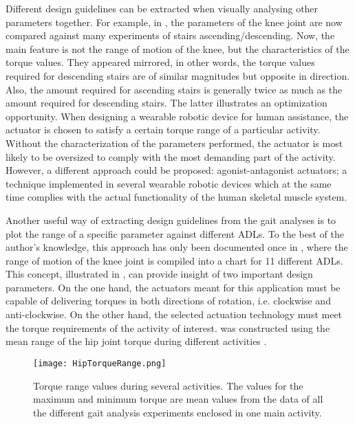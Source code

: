 Different design guidelines can be extracted when visually analysing other parameters together. For example, in  , the parameters of the knee joint are now compared against many experiments of stairs ascending/descending. Now, the main feature is not the range of motion of the knee, but the characteristics of the torque values. They appeared mirrored, in other words, the torque values required for descending stairs are of similar magnitudes but opposite in direction. Also, the amount required for ascending stairs is generally twice as much as the amount required for descending stairs. The latter illustrates an optimization opportunity. When designing a wearable robotic device for human assistance, the actuator is chosen to satisfy a certain torque range of a particular activity. Without the characterization of the parameters performed, the actuator is most likely to be oversized to comply with the most demanding part of the activity. However, a different approach could be proposed: agonist-antagonist actuators; a technique implemented in several wearable robotic devices which at the same time complies with the actual functionality of the human skeletal muscle system.

Another useful way of extracting design guidelines from the gait analyses is to plot the range of a specific parameter against different ADLs. To the best of the author's knowledge, this approach has only been documented once in \cite{rowe2000knee}, where the range of motion of the knee joint is compiled into a chart for 11 different ADLs. This concept, illustrated in , can provide insight of two important design parameters. On the one hand, the actuators meant for this application must be capable of delivering torques in both directions of rotation, i.e. clockwise and anti-clockwise. On the other hand, the selected actuation technology must meet the torque requirements of the activity of interest.  was constructed using the mean range of the hip joint torque during different activities \cite{bovi2011multiple,lee2008biomechanics,han2011biomechanical,protopapadaki2007hip,riener2002stair,mcintosh2006gait,roebroeck1994biomechanics,mak2003joint}.

\begin{figure}[htbp!]
    \centering
    \texttt{[image: HipTorqueRange.png]}
    \caption[Torque range values during several activities. The values for the maximum and minimum torque are mean values from the data of all the different gait analysis experiments enclosed in one main activity.]{Torque range values during several activities. The values for the maximum and minimum torque are mean values from the data of all the different gait analysis experiments enclosed in one main activity. \cite{bovi2011multiple,lee2008biomechanics,han2011biomechanical,protopapadaki2007hip,riener2002stair,mcintosh2006gait,roebroeck1994biomechanics,mak2003joint,solis2017characterization} }
    \label{fig:HipTorqueRange}
\end{figure}

